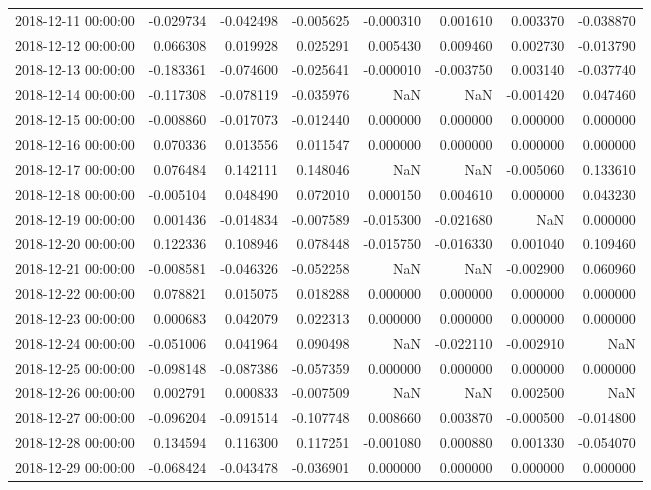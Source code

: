 \begin{tabular}{lrrrrrrr}
2018-12-11 00:00:00 & -0.029734 & -0.042498 & -0.005625 & -0.000310 & 0.001610 & 0.003370 & -0.038870 \\
2018-12-12 00:00:00 & 0.066308 & 0.019928 & 0.025291 & 0.005430 & 0.009460 & 0.002730 & -0.013790 \\
2018-12-13 00:00:00 & -0.183361 & -0.074600 & -0.025641 & -0.000010 & -0.003750 & 0.003140 & -0.037740 \\
2018-12-14 00:00:00 & -0.117308 & -0.078119 & -0.035976 & NaN & NaN & -0.001420 & 0.047460 \\
2018-12-15 00:00:00 & -0.008860 & -0.017073 & -0.012440 & 0.000000 & 0.000000 & 0.000000 & 0.000000 \\
2018-12-16 00:00:00 & 0.070336 & 0.013556 & 0.011547 & 0.000000 & 0.000000 & 0.000000 & 0.000000 \\
2018-12-17 00:00:00 & 0.076484 & 0.142111 & 0.148046 & NaN & NaN & -0.005060 & 0.133610 \\
2018-12-18 00:00:00 & -0.005104 & 0.048490 & 0.072010 & 0.000150 & 0.004610 & 0.000000 & 0.043230 \\
2018-12-19 00:00:00 & 0.001436 & -0.014834 & -0.007589 & -0.015300 & -0.021680 & NaN & 0.000000 \\
2018-12-20 00:00:00 & 0.122336 & 0.108946 & 0.078448 & -0.015750 & -0.016330 & 0.001040 & 0.109460 \\
2018-12-21 00:00:00 & -0.008581 & -0.046326 & -0.052258 & NaN & NaN & -0.002900 & 0.060960 \\
2018-12-22 00:00:00 & 0.078821 & 0.015075 & 0.018288 & 0.000000 & 0.000000 & 0.000000 & 0.000000 \\
2018-12-23 00:00:00 & 0.000683 & 0.042079 & 0.022313 & 0.000000 & 0.000000 & 0.000000 & 0.000000 \\
2018-12-24 00:00:00 & -0.051006 & 0.041964 & 0.090498 & NaN & -0.022110 & -0.002910 & NaN \\
2018-12-25 00:00:00 & -0.098148 & -0.087386 & -0.057359 & 0.000000 & 0.000000 & 0.000000 & 0.000000 \\
2018-12-26 00:00:00 & 0.002791 & 0.000833 & -0.007509 & NaN & NaN & 0.002500 & NaN \\
2018-12-27 00:00:00 & -0.096204 & -0.091514 & -0.107748 & 0.008660 & 0.003870 & -0.000500 & -0.014800 \\
2018-12-28 00:00:00 & 0.134594 & 0.116300 & 0.117251 & -0.001080 & 0.000880 & 0.001330 & -0.054070 \\
2018-12-29 00:00:00 & -0.068424 & -0.043478 & -0.036901 & 0.000000 & 0.000000 & 0.000000 & 0.000000 \\

\end{tabular}
